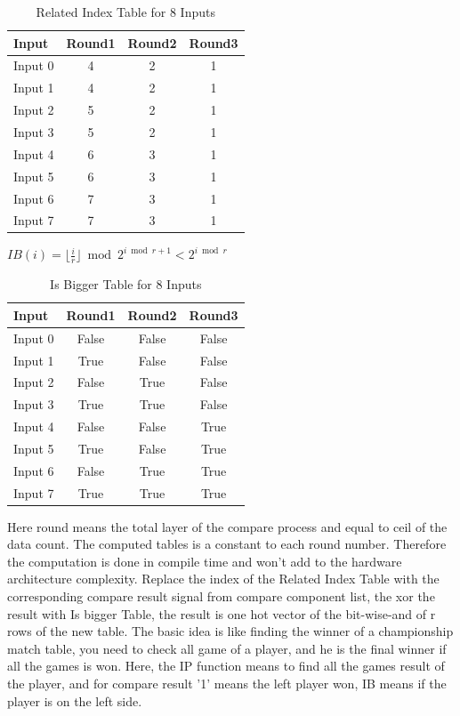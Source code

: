 \begin{table}[htb]
	\centering
	\caption{Related Index Table for 8 Inputs}
	\begin{tabular}{l c c c}
		\toprule
		Input  & Round1  & Round2  & Round3 \\ \midrule
		Input 0 &  4& 2& 1\\
		Input 1 & 4& 2& 1  \\
		Input 2 & 5& 2&   1\\
	        Input 3 & 5& 2& 1\\
	        Input 4 & 6& 3& 1\\
		Input 5 & 6&  3& 1\\
		Input 6 & 7& 3& 1\\
		Input 7 & 7& 3& 1  \\
		\bottomrule
	\end{tabular}
	\label{tab:max-step1}
\end{table}


$
 IB(i) = \lfloor\frac{i}{r} \rfloor \bmod 2 ^{ i \bmod r + 1} < 2 ^{ i \bmod r}
$

\begin{table}[htb]
	\centering
	\caption{Is Bigger Table for 8 Inputs}
	\begin{tabular}{l c c c}
		\toprule
		Input  & Round1  & Round2  & Round3 \\ \midrule
		Input 0 &  False& False& False\\
		Input 1 &  True & False& False  \\
		Input 2 & False& True&  False\\
	    Input 3 & True& True& False\\
	    Input 4 & False& False& True\\
		Input 5 & True&  False& True\\
		Input 6 & False& True&True\\
		Input 7 & True& True& True  \\
		\bottomrule
	\end{tabular}
	\label{tab:max-step2}
\end{table}

Here round means the total layer of the compare process and equal to ceil of the data count. The computed tables is a constant to each round number. Therefore the computation is done in compile time and won't add to the hardware architecture complexity.
Replace the index of the Related Index Table with the corresponding compare result signal from compare component list, the xor the result with Is bigger Table, the result is one hot vector of the bit-wise-and of r rows of the new table.
 The basic idea is like finding the winner of a championship match table, you need to check all game of a player, and he is the final winner if all the games is won. Here, the IP function means to find all the games result of the player, and for compare result '1' means the left player won, IB means if the player is on the left side. 
 
